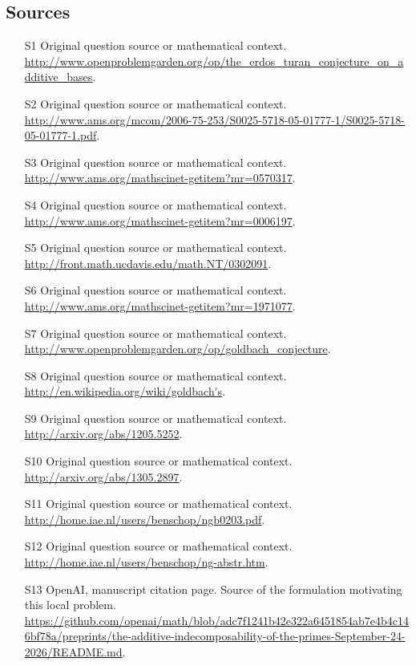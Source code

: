 \documentclass[11pt]{article}
\begin{document}
\subsection{Sources}
\begin{itemize}
\item[S1] Original question source or mathematical context.
\url{http://www.openproblemgarden.org/op/the_erdos_turan_conjecture_on_additive_bases}.
\item[S2] Original question source or mathematical context.
\url{http://www.ams.org/mcom/2006-75-253/S0025-5718-05-01777-1/S0025-5718-05-01777-1.pdf}.
\item[S3] Original question source or mathematical context.
\url{http://www.ams.org/mathscinet-getitem?mr=0570317}.
\item[S4] Original question source or mathematical context.
\url{http://www.ams.org/mathscinet-getitem?mr=0006197}.
\item[S5] Original question source or mathematical context.
\url{http://front.math.ucdavis.edu/math.NT/0302091}.
\item[S6] Original question source or mathematical context.
\url{http://www.ams.org/mathscinet-getitem?mr=1971077}.
\item[S7] Original question source or mathematical context.
\url{http://www.openproblemgarden.org/op/goldbach_conjecture}.
\item[S8] Original question source or mathematical context.
\url{http://en.wikipedia.org/wiki/goldbach's}.
\item[S9] Original question source or mathematical context.
\url{http://arxiv.org/abs/1205.5252}.
\item[S10] Original question source or mathematical context.
\url{http://arxiv.org/abs/1305.2897}.
\item[S11] Original question source or mathematical context.
\url{http://home.iae.nl/users/benschop/ngb0203.pdf}.
\item[S12] Original question source or mathematical context.
\url{http://home.iae.nl/users/benschop/ng-abstr.htm}.
\item[S13] OpenAI, manuscript citation page. Source of the formulation motivating this local problem.
\url{https://github.com/openai/math/blob/adc7f1241b42e322a6451854ab7e4b4c146bf78a/preprints/the-additive-indecomposability-of-the-primes-September-24-2026/README.md}.
\end{itemize}
\end{document}
